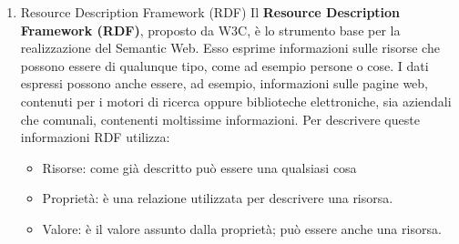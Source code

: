 \documentclass[a4paper,11pt]{article}
\begin{document}
\begin{enumerate}
\begin{enumerate}[label*=\arabic*.]
\begin{itemize}
esprimibili con asserzioni (statement) costituite da triple formate da
soggetto, predicato e oggetto (identificati come subject, predicate e
object, rispettivamente)\newpage
				\item RDFS\footnote{RDF Schema}: Estensione del RDF, fornisce elementi di base per la descrizione di ontologie, chiamati vocabolari per le risorse RDF. Queste risorse possono essere salvate in un storage di triple che vengono successivamente elaborati con il linguaggio  SPARQL.
				\item OWL\footnote{Ontology Web Language}: è un linguaggio che deriva dalle logiche descrittive, e offre più costrutti rispetto a RDFS. OWL si suddivide in tre categorie: OWL Lite per tassonomie e vincoli semplici, OWL DL per il pieno supporto della logica descrittiva e OWL Full per la massima espressività e la libertà sintattica di RDF. 
				\item SPARQL: è un linguaggio di interrogazione per tipologie di dati rappresentati in RDF; è uno degli elementi cardini per sviluppare il web semantico e consente di estrarre informazioni dalle basi di conoscenza distribuite sul web.
				\item Livello Logiche Descrittive DL: fornisce un formalismo logico per il Semantic Web, le DL si differenziano tra loro per i costruttori ammessi sia sui concetti che sui ruoli.				
			\end{itemize}\newpage			 			
			\item {Resource Description Framework (RDF)}			\newline
			Il \textbf{Resource Description Framework (RDF)}, proposto da W3C, è lo strumento base per la realizzazione del Semantic Web. Esso esprime informazioni sulle risorse che possono essere di qualunque tipo, come ad esempio persone o cose.\newline
I dati espressi possono anche essere, ad esempio, informazioni sulle pagine web, contenuti per i motori di ricerca oppure biblioteche elettroniche, sia aziendali che comunali, contenenti moltissime informazioni.
Per descrivere queste informazioni RDF utilizza:
			\begin{itemize}
				\item Risorse: come già descritto può essere una qualsiasi cosa
				\item Proprietà: è una relazione utilizzata per descrivere una risorsa.
				\item Valore: è il valore assunto dalla proprietà; può essere anche una risorsa.
			\end{itemize}


\end{enumerate}
\end{enumerate}
\end{document}
